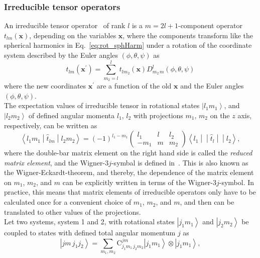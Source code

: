 \subsubsection*{Irreducible tensor operators}
An irreducible tensor operator~\cite{varshalovich1988} of rank $l$ is a $m=2l+1$-component operator $t_{lm}(\mathbf{x})$, depending on the variables $\mathbf{x}$, where the components transform like the spherical harmonics in Eq.~\eqref{eq:rot_sphHarm} under a rotation of the coordinate system described by the Euler angles $(\phi,\theta,\psi)$ as
\begin{equation}
t_{lm}(\mathbf{x}^\prime) = \sum_{m_2=l}^l t_{lm_2}(\mathbf{x}) D^l_{m_2\,m}(\phi,\theta,\psi)
\end{equation}
where the new coordinates $\mathbf{x}^\prime$ are a function of the old $\mathbf{x}$ and the Euler angles $(\phi,\theta,\psi)$.\\ 
The expectation values of irreducible tensor in rotational states $\left|l_1m_1\right>$, and $\left|l_2m_2\right>$ of defined angular momenta $l_1,\,l_2$ with projections $m_1,\,m_2$ on the $z$ axis, respectively, can be written as~\cite{varshalovich1988}
\begin{equation}
\label{app:wignerEckardt}
\left< l_1 m_1 \middle| \hat{t}_{lm} \middle| l_2 m_2\right>=
(-1)^{l_1-m_1}
\begin{pmatrix}
l_1 & l & l_2\\
-m_1 & m & m_2
\end{pmatrix}
\left<l_1 \middle|\middle| \hat{t}_{l} \middle|\middle| l_2\right>,
\end{equation}
where the double-bar matrix element on the right hand side is called the \textit{reduced matrix element}, and the Wigner-$3j$-symbal is defined in~\cite[Section 8.]{varshalovich1988}. This is also known as the Wigner-Eckardt-theorem, and thereby, the dependence of the matrix element on $m_1$, $m_2$, and $m$ can be explicitly written in terms of the Wigner-$3j$-symbol. In practice, this means that matrix elements of irreducible operators only have to be calculated once for a convenient  choice of $m_1$, $m_2$, and $m$, and then can be translated to other values of the projections.\\[9pt]
Let two systems, system 1 and 2, with rotational states $\left|j_1m_1\right>$ and $\left| j_2m_2\right>$ be  coupled to states with defined total angular momentum $j$ as
\begin{equation}
\label{eq:coupledState}
\left|jm\,j_1j_2\right> = \sum_{m_1,m_2}\text{C}^{jm}_{j_1m_1\,j_2m_2}
\left|j_1m_1\right>\otimes\left| j_1m_1\right>,
\end{equation}
